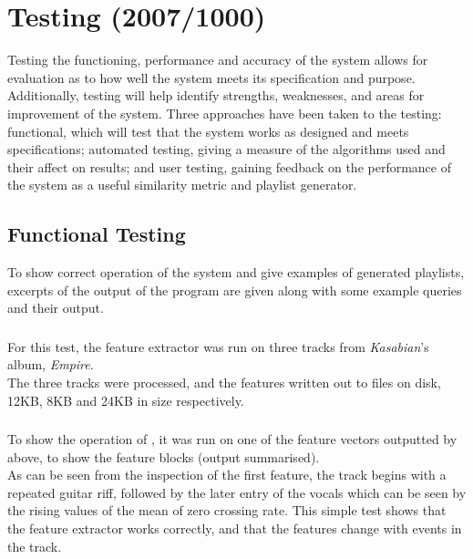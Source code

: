 \newcommand{\graph}[2]{
\begin{figure}[!hp]
	\caption{#2}
	\texttt{[image: testing/graphs/\#1]}
	\label{graph:#1}
\end{figure}}
\chapter{Testing (2007/1000)}
Testing the functioning, performance and accuracy of the system allows for evaluation as to how well the system meets its specification and purpose. Additionally, testing will help identify strengths, weaknesses, and areas for improvement of the system. Three approaches have been taken to the testing: functional, which will test that the system works as designed and meets specifications; automated testing, giving a measure of the algorithms used and their affect on results; and user testing, gaining feedback on the performance of the system as a useful similarity metric and playlist generator.
\section{Functional Testing}
\label{text:testing:functional}
To show correct operation of the system and give examples of generated playlists, excerpts of the output of the program are given along with some example queries and their output.
\subsection{}
For this test, the feature extractor was run on three tracks from \emph{Kasabian}'s album, \emph{Empire}.\\

The three tracks were processed, and the features written out to files on disk, 12KB, 8KB and 24KB in size respectively.
\subsection{}
To show the operation of , it was run on one of the feature vectors outputted by  above, to show the feature blocks (output summarised).\\

As can be seen from the inspection of the first feature, the track begins with a repeated guitar riff, followed by the later entry of the vocals which can be seen by the rising values of the mean of zero crossing rate. This simple test shows that the feature extractor works correctly, and that the features change with events in the track.
